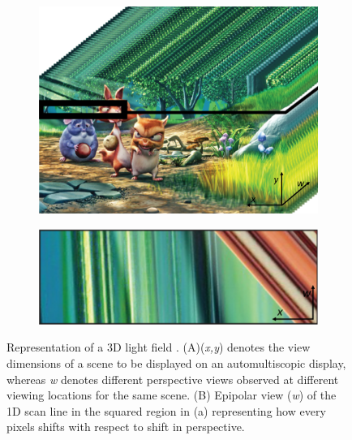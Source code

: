 \begin{figure}[htbp]
    \centering
    \begin{subfigure}[b]{0.48\textwidth}
        \includegraphics[width=\textwidth]{./Template_Figures/lightfield}
        \caption{}\label{fig:lightfield_rep}
    \end{subfigure}
    \begin{subfigure}[b]{0.48\textwidth}
        \includegraphics[width=\textwidth]{./Template_Figures/lightfield_epi}
        \caption{}\label{fig:lightfield_epi}
    \end{subfigure}

    \caption{Representation of a 3D light field \cite{du2014improving}. (A)(\emph{x,y}) denotes the view dimensions of a scene to be displayed on an automultiscopic display, whereas \emph{w} denotes different perspective views observed at different viewing locations for the same scene. (B) Epipolar view (\emph{w}) of the 1D scan line in the squared region in (a) representing how every pixels shifts with respect to shift in perspective.\label{fig:lightfeild}}
\end{figure}
\pagebreak

